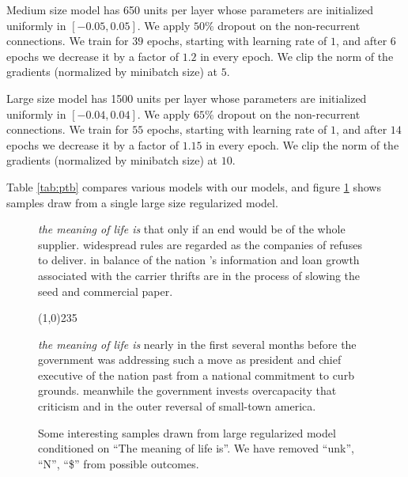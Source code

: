 \documentclass{article}
\begin{document}
Medium size model has 650 units per layer
whose parameters are initialized uniformly in $[-0.05,
  0.05]$. We apply $50\%$ dropout on the non-recurrent connections. We
train for $39$ epochs, starting with learning rate of $1$, and after
$6$ epochs we decrease it by a factor of $1.2$ in every epoch. We
clip the norm of the gradients
(normalized by minibatch size) at $5$. 


Large size model has 1500 units per layer
whose parameters are initialized uniformly in $[-0.04,
  0.04]$. We apply $65\%$ dropout on the non-recurrent connections. We
train for $55$ epochs, starting with learning rate of $1$, and after
$14$ epochs we decrease it by a factor of $1.15$ in every epoch. We
clip the norm of the gradients
(normalized by minibatch size) at $10$. 


Table \ref{tab:ptb} compares various models with our models, and figure \ref{fig:meaning}
shows samples draw from a single large size regularized model.

\begin{figure}

\textit{the meaning of life is} that only if an end would be of the whole supplier. widespread rules are regarded as the companies of refuses to deliver. in balance of the nation 's information and loan growth associated with the carrier thrifts are in the process of slowing the seed and commercial paper.

\line(1,0){235}

\textit{the meaning of life is} nearly in the first several months before the government was addressing such a move as president and chief executive of the nation past from a national commitment to curb grounds. meanwhile the government invests overcapacity that criticism and in the outer reversal of small-town america.

  \caption{Some interesting samples drawn from large regularized model conditioned on ``The meaning of life is''. We have removed ``unk'', ``N'', ``\$'' from possible outcomes.}

  \label{fig:meaning}
\end{figure}
\end{document}
